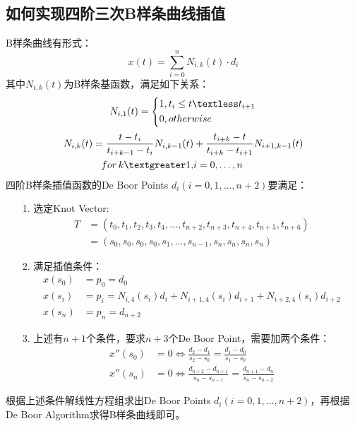 \documentclass{article}
\begin{document}
\subsection{如何实现四阶三次B样条曲线插值}
B样条曲线有形式：
	$$x(t)=\sum_{i=0}^{n}N_{i,k}(t)\cdot d_i$$
其中$N_{i,k}(t)$为B样条基函数，满足如下关系：
\begin{equation*}
	N_{i,1}(t)=
	\left\{
	\begin{aligned}
		&1,t_i\leq t\textless t_{i+1}\\
		&0,otherwise
	\end{aligned}
	\right.
\end{equation*}
\begin{equation*}
	\begin{aligned}
		N_{i,k}(t)=\frac{t-t_i}{t_{i+k-1}-t_i}N_{i,k-1}(t)&+\frac{t_{i+k}-t}{t_{i+k}-t_{i+1}}N_{i+1,k-1}(t)\\
		for\,k\textgreater1,&i=0,\dots,n
	\end{aligned}
\end{equation*}
四阶B样条插值函数的De Boor Points $d_i(i=0,1,\dots,n+2)$要满足：
\begin{enumerate}
	\item [1.]选定Knot Vector:
	\begin{equation}
		\begin{aligned}
			T&=(t_0,t_1,t_2,t_3,t_4,\dots,t_{n+2},t_{n+3},t_{n+4},t_{n+5},t_{n+6})\\
			&=(s_0,s_0,s_0,s_0,s_1,\dots,s_{n-1},s_n,s_n,s_n,s_n)
		\end{aligned}
	\end{equation}
	\item  [2.]满足插值条件：
	\begin{equation}
		\begin{aligned}
			x(s_0)&=p_0=d_0\\
			x(s_i)&=p_i=N_{i,4}(s_i)d_i+N_{i+1,4}(s_i)d_{i+1}+N_{i+2,4}(s_i)d_{i+2}\\
			x(s_n)&=p_n=d_{n+2}
		\end{aligned}
	\end{equation}
	\item [3.]上述有$n+1$个条件，要求$n+3$个De Boor Point，需要加两个条件：
	\begin{equation}
		\begin{aligned}
			x''(s_0)&=0\Leftrightarrow \frac{d_2-d_1}{s_2-s_0}=\frac{d_1-d_0}{s_1-s_0}\\
			x''(s_n)&=0\Leftrightarrow \frac{d_{n+2}-d_{n+1}}{s_n-s_{n-1}}=\frac{d_{n+1}-d_n}{s_n-s_{n-2}}
		\end{aligned}
	\end{equation}
\end{enumerate}
根据上述条件解线性方程组求出De Boor Points $d_i(i=0,1,\dots,n+2)$，再根据De Boor Algorithm求得B样条曲线即可。
\end{document}
